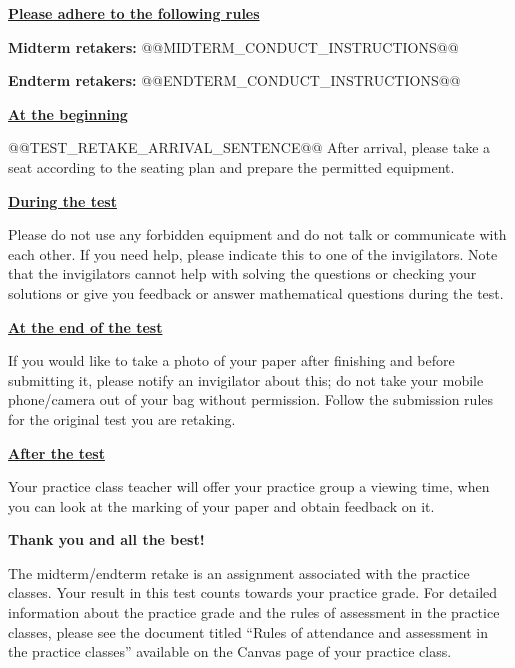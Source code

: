 \documentclass[11pt,a4paper]{article}
\newcommand{\heading}[1]{\par\medskip\textbf{\underline{#1}}\par}
\begin{document}
\heading{Please adhere to the following rules}
\textbf{Midterm retakers:} @@MIDTERM_CONDUCT_INSTRUCTIONS@@\par
\textbf{Endterm retakers:} @@ENDTERM_CONDUCT_INSTRUCTIONS@@

\heading{At the beginning}
@@TEST_RETAKE_ARRIVAL_SENTENCE@@
After arrival, please take a seat according to the seating plan and prepare the
permitted equipment.

\heading{During the test}
Please do not use any forbidden equipment and do not talk or communicate with each
other. If you need help, please indicate this to one of the invigilators. Note that
the invigilators cannot help with solving the questions or checking your solutions
or give you feedback or answer mathematical questions during the test.

\heading{At the end of the test}
If you would like to take a photo of your paper after finishing and before
submitting it, please notify an invigilator about this; do not take your mobile
phone/camera out of your bag without permission. Follow the submission rules for
the original test you are retaking.

\heading{After the test}
Your practice class teacher will offer your practice group a viewing time, when
you can look at the marking of your paper and obtain feedback on it.

\textbf{Thank you and all the best!}

The midterm/endterm retake is an assignment associated with the practice classes.
Your result in this test counts towards your practice grade. For detailed
information about the practice grade and the rules of assessment in the practice
classes, please see the document titled ``Rules of attendance and assessment in
the practice classes'' available on the Canvas page of your practice class.
\end{document}
